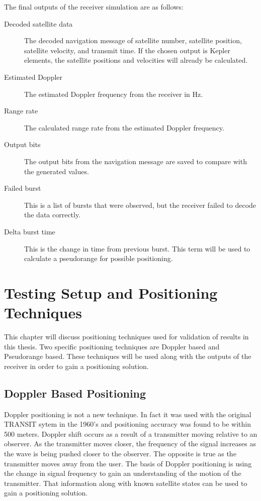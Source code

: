 \documentclass[12pt]{report}
\begin{document}
The final outputs of the receiver simulation are as follows:
\begin{description}
    \item[Decoded satellite data] The decoded navigation message of satellite number, satellite position, satellite velocity, and transmit time. If the chosen output is Kepler elements, the satellite positions and velocities will already be calculated.
    \item[Estimated Doppler] The estimated Doppler frequency from the receiver in Hz.
    \item[Range rate] The calculated range rate from the estimated Doppler frequency. 
    \item[Output bits] The output bits from the navigation message are saved to compare with the generated values.
    \item[Failed burst] This is a list of bursts that were observed, but the receiver failed to decode the data correctly.
    \item[Delta burst time] This is the change in time from previous burst. This term will be used to calculate a pseudorange for possible positioning. 
\end{description}

\chapter{Testing Setup and Positioning Techniques}
This chapter will discuss positioning techniques used for validation of results in this thesis. Two specific positioning techniques are Doppler based and Pseudorange based. These techniques will be used along with the outputs of the receiver in order to gain a positioning solution.
 
\section{Doppler Based Positioning} \label{sec:DopplerPosTechnique}
Doppler positioning is not a new technique. In fact it was used with the original TRANSIT sytem in the 1960's and positioning accuracy was found to be within 500 meters. Doppler shift occurs as a result of a transmitter moving relative to an observer. As the transmitter moves closer, the frequency of the signal increases as the wave is being pushed closer to the observer. The opposite is true as the transmitter moves away from the user. The basis of Doppler positioning is using the change in signal frequency to gain an understanding of the motion of the transmitter. That information along with known satellite states can be used to gain a positioning solution.
\end{document}
